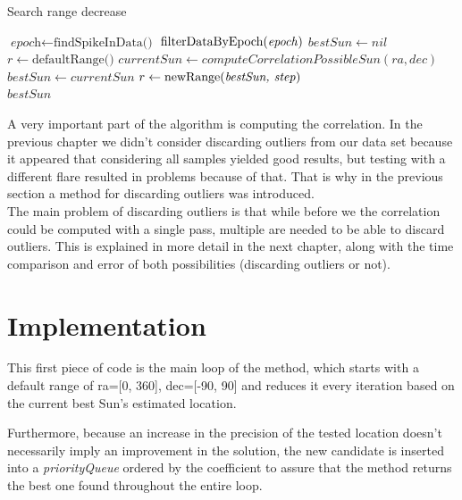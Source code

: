 \begin{algorithm}
	\caption{Search range decrease}\label{searchRangeDecrease}
	\begin{algorithmic}[1]
		\State $\textit{epoch} \gets \text{findSpikeInData()}$ 
		\State $\text{filterDataByEpoch(\textit{epoch})}$
		\State $bestSun \gets nil$
		\State $r \gets \text{defaultRange()}$ 
		\State $currentSun \gets computeCorrelationPossibleSun(ra, dec)$
		\State $bestSun \gets currentSun$
		\State $r \gets \text{newRange(\textit{bestSun, step})}$ 
		\EndIf
		\EndFor
		\EndFor
		\EndFor
		\\
		\Return $bestSun$
		\EndProcedure
	\end{algorithmic}
\end{algorithm}

A very important part of the algorithm is computing the correlation. In the previous chapter we didn't consider discarding outliers from our data set because it appeared that considering all samples yielded good results, but testing with a different flare resulted in problems because of that. That is why in the previous section a method for discarding outliers was introduced. \\

The main problem of discarding outliers is that while before we the correlation could be computed with a single pass, multiple are needed to be able to discard outliers.
This is explained in more detail in the next chapter, along with the time comparison and error of both possibilities (discarding outliers or not).

\section{Implementation}

This first piece of code is the main loop of the method, which starts with a default range of ra=[0, 360], dec=[-90, 90] and reduces it every iteration based on the current best Sun's estimated location. 

Furthermore, because an increase in the precision of the tested location doesn't necessarily imply an improvement in the solution, the new candidate is inserted into a \textit{priorityQueue} ordered by the coefficient to assure that the method returns the best one found throughout the entire loop. 

